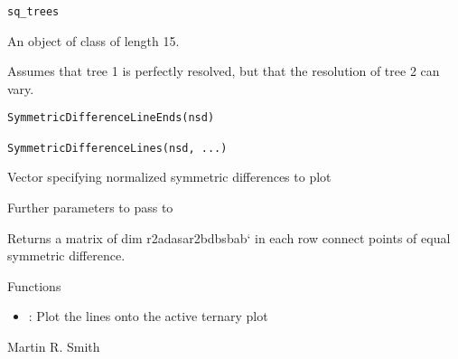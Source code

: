 \documentclass[a4paper]{book}
\begin{document}
%
\begin{Usage}
\begin{verbatim}
sq_trees
\end{verbatim}
\end{Usage}
%
\begin{Format}
An object of class  of length 15.
\end{Format}
%
\begin{Description}\relax
Assumes that tree 1 is perfectly resolved, but that the resolution
of tree 2 can vary.
\end{Description}
%
\begin{Usage}
\begin{verbatim}
SymmetricDifferenceLineEnds(nsd)

SymmetricDifferenceLines(nsd, ...)
\end{verbatim}
\end{Usage}
%
\begin{Arguments}
\begin{ldescription}
\item[\code{nsd}] Vector specifying normalized symmetric differences to plot

\item[\code{...}] Further parameters to pass to
\end{ldescription}
\end{Arguments}
%
\begin{Value}
Returns a matrix of dim r2a\code{, }da\code{, }sa\code{, }r2b\code{, }dbsbab` in each row connect points
of equal symmetric difference.
\end{Value}
%
\begin{Section}{Functions}
\begin{itemize}

\item {}: Plot the lines onto the active ternary plot

\end{itemize}
\end{Section}
%
\begin{Author}\relax
Martin R. Smith
\end{Author}
\end{document}
